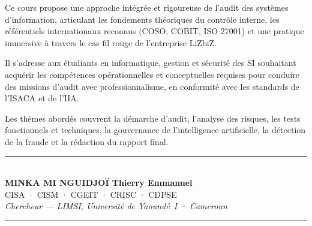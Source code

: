 \documentclass[12pt, a4paper, twoside, openright]{book}
\begin{document}
\begin{center}
\begin{minipage}{0.75\textwidth}
\color{white!85!gray}
Ce cours propose une approche intégrée et rigoureuse de l'audit des systèmes d'information, articulant les fondements théoriques du contrôle interne, les référentiels internationaux reconnus (COSO, COBIT, ISO 27001) et une pratique immersive à travers le cas fil rouge de l'entreprise LiZbiZ.

\medskip

Il s'adresse aux étudiants en informatique, gestion et sécurité des SI souhaitant acquérir les compétences opérationnelles et conceptuelles requises pour conduire des missions d'audit avec professionnalisme, en conformité avec les standards de l'ISACA et de l'IIA.

\medskip

Les thèmes abordés couvrent la démarche d'audit, l'analyse des risques, les tests fonctionnels et techniques, la gouvernance de l'intelligence artificielle, la détection de la fraude et la rédaction du rapport final.
\end{minipage}
\end{center}

\vfill

\begin{center}
    {\color{CouleurAccent}\rule{0.5\linewidth}{0.8pt}}\\[1ex]
    {\color{white}\bfseries MINKA MI NGUIDJOÏ Thierry Emmanuel}\\[0.3ex]
    {\color{white!75!gray}\footnotesize
        CISA · CISM · CGEIT · CRISC · CDPSE}\\[0.3ex]
    {\color{white!65!gray}\footnotesize\itshape
        Chercheur — LIMSI, Université de Yaoundé~I · Cameroun}\\[1ex]
    {\color{CouleurAccent}\rule{0.5\linewidth}{0.8pt}}
\end{center}

\vspace{1cm}

\afterpage{\nopagecolor}
\end{document}
